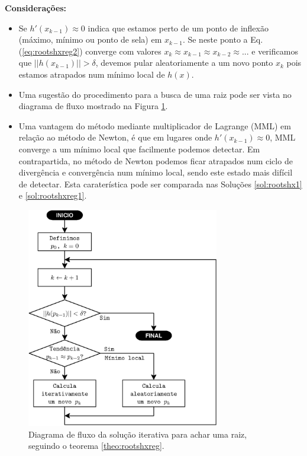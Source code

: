 \begin{theorem}
\textbf{Considerações:}
\begin{itemize} 
\item Se $h'(x_{k-1})\approx 0$ indica que estamos perto de um ponto de inflexão 
(máximo, mínimo ou ponto de sela) em $x_{k-1}$. Se neste ponto a Eq. (\ref{eq:rootshxreg2})
converge com valores $x_k\approx x_{k-1}\approx x_{k-2}\approx ...$ e verificamos que $||h(x_{k-1})||>\delta$,
devemos pular aleatoriamente a um novo ponto $x_k$ pois estamos atrapados num mínimo local de $h(x)$.  
\item Uma sugestão do procedimento para a busca de uma raiz pode ser vista no diagrama de fluxo
mostrado na Figura \ref{fig:fluxorhxreg3}. 
\end{itemize}
\end{theorem}

\begin{tcbattention}
\begin{itemize}
\item Uma vantagem do método mediante multiplicador de Lagrange (MML) em relação ao método de Newton,
é que em lugares onde $h'(x_{k-1})\approx 0$, MML converge a um mínimo local 
que facilmente podemos detectar. Em contrapartida,
no método de Newton podemos ficar atrapados num ciclo de divergência e convergência num mínimo local, 
sendo este estado mais difícil de detectar.
Esta caraterística pode ser comparada nas Soluções \ref{sol:rootshx1} e \ref{sol:rootshxreg1}.
\end{itemize}
\end{tcbattention}

\begin{figure}[!h]
     \centering
         \includegraphics[width=0.75\textwidth]{chapters/roots/fluxo3.eps}
        \caption{Diagrama de fluxo da solução iterativa para achar uma raiz, seguindo o teorema \ref{theo:rootshxreg}.}
        \label{fig:fluxorhxreg3}
\end{figure}

